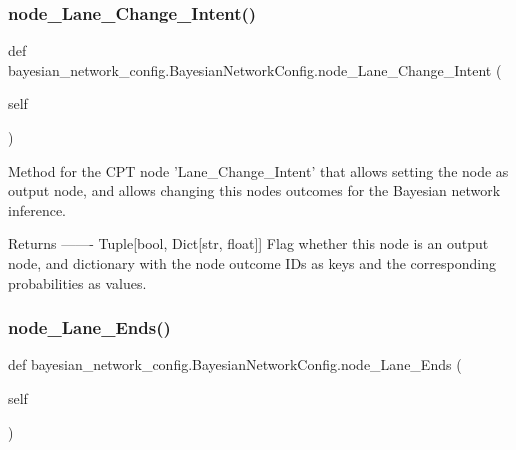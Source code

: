\subsubsection{\texorpdfstring{node\+\_\+\+Lane\+\_\+\+Change\+\_\+\+Intent()}{node\_Lane\_Change\_Intent()}\hspace{0.1cm}{\footnotesize\ttfamily [2/2]}}
{\footnotesize\ttfamily def bayesian\+\_\+network\+\_\+config.\+Bayesian\+Network\+Config.\+node\+\_\+\+Lane\+\_\+\+Change\+\_\+\+Intent (\begin{DoxyParamCaption}\item[{}]{self }\end{DoxyParamCaption})}

\begin{DoxyVerb}Method for the CPT node 'Lane_Change_Intent' that allows setting the node as output node, 
and allows changing this nodes outcomes for the Bayesian network inference.

Returns
-------
Tuple[bool, Dict[str, float]]
    Flag whether this node is an output node, and dictionary with the node outcome IDs as keys 
    and the corresponding probabilities as values.
\end{DoxyVerb}
 \mbox{\label{classbayesian__network__config_1_1_bayesian_network_config_a9a6e2aefc96155fcdd4a825b1defbe76}} 
\subsubsection{\texorpdfstring{node\+\_\+\+Lane\+\_\+\+Ends()}{node\_Lane\_Ends()}\hspace{0.1cm}{\footnotesize\ttfamily [1/2]}}
{\footnotesize\ttfamily def bayesian\+\_\+network\+\_\+config.\+Bayesian\+Network\+Config.\+node\+\_\+\+Lane\+\_\+\+Ends (\begin{DoxyParamCaption}\item[{}]{self }\end{DoxyParamCaption})}

